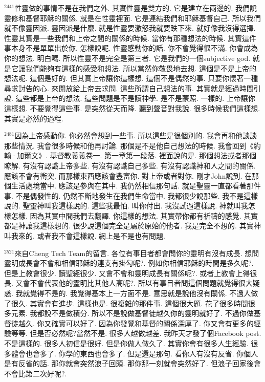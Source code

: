 \documentclass{book}
\begin{document}
$^{2441}$性靈做的事情不是在我們之外.
其實性靈是雙方的.
它是建立在兩邊的.
我們說靈修和基督耶穌的關係.
就是在性靈裡面.
它是連結我們和耶穌基督自己.
所以我們就不像靈因派.
靈因派是什麼.
就是性靈要激怒我就要跌下來.
就好像我沒得選擇.
性靈其實是一些我們和上帝之間的關係的時候.
當你有那種想法的時候.
其實這件事本身不是單單出於你.
怎樣說呢.
性靈感動你的話.
你不會覺得很不滿.
你會成為你的想法.
明白嗎.
所以性靈不是完全是第三者.
它是我們的一個subjective god.
就是它讓我們能夠有這樣的感受和想法.
所以當然你敬畏地去想.
這個是不是上帝的想法呢.
這個是好的.
但其實上帝讓你這樣想.
這個不是偶然的事.
只要你懷著一種尋求討告的心.
來開放給上帝去求問.
這些所謂自己想法的事.
其實就是經過時間引證.
這些都是上帝的想法.
這些問題是不是讀神學.
是不是蒙照.
一樣的.
上帝讓你這樣想.
不要覺得這些事.
是突然從天而降.
聽到聲音對我說.
很多時候我們這樣想.
其實是必然的過程.

$^{2481}$因為上帝感動你.
你必然會想到一些事.
所以這些是很個別的.
我會再和他談談那些情況.
我會很多時候和他再討論.
那個是不是他自己想法的時候.
我會回到《約翰·加爾文》.
基督教義義卷一.
第一章第一段落.
裡面說的是.
那個想法或者那個瞭解.
有沒有認識上帝多些.
有沒有認識自己多些.
有沒有認識神和人之間的關係.
應該不會有衝突.
而那樣東西應該會豐富你.
對上帝或者對你.
剛才John說到.
在那個生活處境當中.
應該是參與在其中.
我仍然相信那句話.
就是聖靈一直都看著那件事.
不是偶發性的.
仍然不斷地發生在我們生命當中.
我都很少說那些.
我不是這樣說的.
聖靈神叫我這樣說的.
這些我最怕.
叫你付出.
我沒試過這樣說.
神就叫我怎樣怎樣.
因為其實中間我們去翻譯.
你這樣的想法.
其實帶你都有祈禱的感覺.
其實都是神讓我這樣想的.
很少說這個完全是屬於原始的他者.
我是完全不想的.
其實神叫我來的.
或者我不會這樣說.
網上是不是也有問題.

$^{2521}$來自Cheng Tech Team的留言.
各位有事目者都會問你的靈明有沒有成長.
想問靈明成長會不會和相信耶穌的連支有掛勾呢?.
例如你相信耶穌的時間是多久呢?.
但是上教會很少.
讀聖經很少.
又會不會和靈明成長有關係呢?.
或者上教會上得很長.
又會不會代表他的靈明比其他人高呢?.
所以有事目者問這個問題就覺得很大疑惑.
我就覺得不是的.
我覺得基本上一方面不是.
意思就是說他沒有關係.
不過人做了很久.
其實會有進步.
這樣也是.
很複雜的那件事.
這個很大題.
花了很多時間很多元素.
我都說不是做積分.
所以不是說做基督徒越久你的靈明就好了.
不過你做基督徒越久.
你又確實可以好了.
因為你發覺和基督的關係深厚了.
你又會有更多的經驗等等.
但是否必然呢?當然不是.
很多人越做越差.
我昨天才發了個Facebook post.
不是這樣的.
很多人初信是很好.
但是你做人做久了.
其實你會有很多人生經驗.
很多體會也會多了.
你學的東西也會多了.
但是還是那句.
看你人有沒有反省.
你個人是有反省的話.
那你就會突然浪子回頭.
那你那一刻就會突然好了.
但浪子回家後會不會比第二次好呢?.
\end{document}
